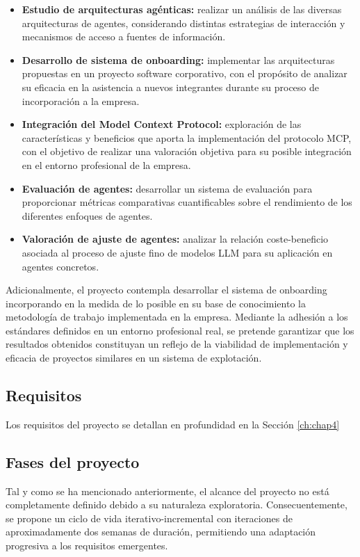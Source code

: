 \begin{itemize}
  \item\textbf{Estudio de arquitecturas agénticas: }realizar un análisis de las diversas arquitecturas de agentes, considerando distintas estrategias de interacción y mecanismos de acceso a fuentes de información.
  \item\textbf{Desarrollo de sistema de onboarding: }implementar las arquitecturas propuestas en un proyecto software corporativo, con el propósito de analizar su eficacia en la asistencia a nuevos integrantes durante su proceso de incorporación a la empresa.
  \item\textbf{Integración del Model Context Protocol: }exploración de las características y beneficios que aporta la implementación del protocolo MCP, con el objetivo de realizar una valoración objetiva para su posible integración en el entorno profesional de la empresa.
  \item\textbf{Evaluación de agentes: }desarrollar un sistema de evaluación para proporcionar métricas comparativas cuantificables sobre el rendimiento de los diferentes enfoques de agentes. 
  \item\textbf{Valoración de ajuste de agentes: }analizar la relación coste-beneficio asociada al proceso de ajuste fino de modelos LLM para su aplicación en agentes concretos.
\end{itemize}

Adicionalmente, el proyecto contempla desarrollar el sistema de onboarding incorporando en la medida de lo posible en su base de conocimiento la metodología de trabajo implementada en la empresa. Mediante la adhesión a los estándares definidos en un entorno profesional real, se pretende garantizar que los resultados obtenidos constituyan un reflejo de la viabilidad de implementación y eficacia de proyectos similares en un sistema de explotación. 

\subsection{Requisitos}
Los requisitos del proyecto se detallan en profundidad en la Sección \ref{ch:chap4}

\subsection{Fases del proyecto}
Tal y como se ha mencionado anteriormente, el alcance del proyecto no está completamente definido debido a su naturaleza exploratoria. Consecuentemente, se propone un ciclo de vida iterativo-incremental con iteraciones de aproximadamente dos semanas de duración, permitiendo una adaptación progresiva a los requisitos emergentes.

